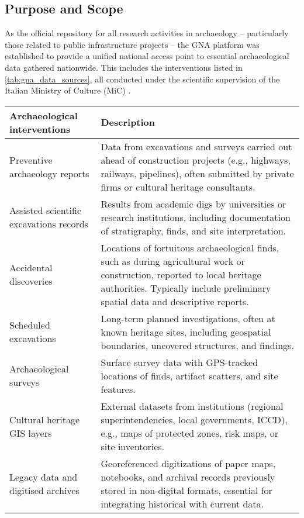 \begin{spacing}{1.5}
\subsection{Purpose and Scope}
As the official repository for all research activities in archaeology -- particularly those related to public infrastructure projects -- the GNA platform was established to provide a unified national access point to essential archaeological data gathered nationwide. This includes the interventions listed in \autoref{tab:gna_data_sources}, all conducted under the scientific supervision of the Italian Ministry of Culture (MiC) \citep{acconcia_pubblicazione_2023,falcone_dematerializzazione_2023}.

\addtocounter{table}{-1}
\begin{table}[H]
\centering
\footnotesize
\begin{tabularx}{\textwidth}{ l >{\justifying\noindent\arraybackslash}p{} }
\toprule
\textbf{Archaeological interventions} & \textbf{Description} \\
\midrule
Preventive archaeology reports & Data from excavations and surveys carried out ahead of construction projects (e.g., highways, railways, pipelines), often submitted by private firms or cultural heritage consultants. \\
\cmidrule(lr){1-2}
Assisted scientific excavations records & Results from academic digs by universities or research institutions, including documentation of stratigraphy, finds, and site interpretation. \\
\cmidrule(lr){1-2}
Accidental discoveries & Locations of fortuitous archaeological finds, such as during agricultural work or construction, reported to local heritage authorities. Typically include preliminary spatial data and descriptive reports. \\
\cmidrule(lr){1-2}
Scheduled excavations & Long-term planned investigations, often at known heritage sites, including geospatial boundaries, uncovered structures, and findings. \\
\cmidrule(lr){1-2}
Archaeological surveys & Surface survey data with GPS-tracked locations of finds, artifact scatters, and site features. \\
\cmidrule(lr){1-2}
Cultural heritage GIS layers & External datasets from institutions (regional superintendencies, local governments, ICCD), e.g., maps of protected zones, risk maps, or site inventories. \\
\cmidrule(lr){1-2}
Legacy data and digitised archives & Georeferenced digitizations of paper maps, notebooks, and archival records previously stored in non-digital formats, essential for integrating historical with current data. \\

\end{tabularx}
\end{table}
\end{spacing}

